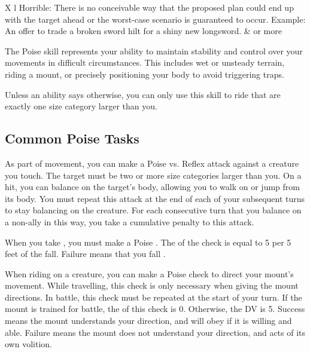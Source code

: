\begin{columntable}
\begin{dtabularx}{\columnwidth}{X l}
          Horrible: There is no conceivable way that the proposed plan could end up with the target ahead or the worst-case scenario is guaranteed to occur. Example: An offer to trade a broken sword hilt for a shiny new longsword.                                                                                      &  or more                                                    \\
        \end{dtabularx}
      \end{columntable}

\newpage
{}
  The Poise skill represents your ability to maintain stability and control over your movements in difficult circumstances.
  This includes wet or unsteady terrain, riding a mount, or precisely positioning your body to avoid triggering traps.

  Unless an ability says otherwise, you can only use this skill to ride  that are exactly one size category larger than you.

  \subsection{Common Poise Tasks}
     As part of movement, you can make a Poise vs. Reflex attack against a creature you touch.
    The target must be two or more size categories larger than you.
    On a hit, you can balance on the target's body, allowing you to walk on or jump from its body.
    You must repeat this attack at the end of each of your subsequent turns to stay balancing on the creature.
    For each consecutive turn that you balance on a non-ally in this way, you take a cumulative  penalty to this attack.

     When you take , you must make a Poise .
    The  of the check is equal to 5  per 5 feet of the fall.
    Failure means that you fall \prone.

     When riding on a creature, you can make a Poise check to direct your mount's movement.
    While travelling, this check is only necessary when giving the mount directions.
    In battle, this check must be repeated at the start of your turn.
    If the mount is trained for battle, the  of this check is 0.
    Otherwise, the DV is 5.
    Success means the mount understands your direction, and will obey if it is willing and able.
    Failure means the mount does not understand your direction, and acts of its own volition.

